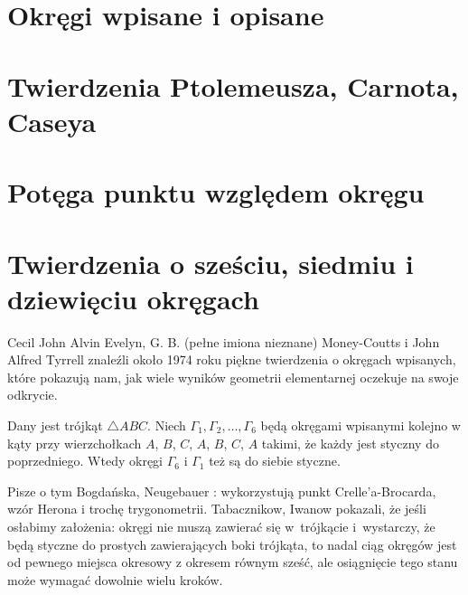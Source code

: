 \section{Okręgi wpisane i opisane}


\section{Twierdzenia Ptolemeusza, Carnota, Caseya}


%
\section{Potęga punktu względem okręgu}

%

\section{Twierdzenia o sześciu, siedmiu i dziewięciu okręgach}
\label{sssection_6_7_9_circles}
Cecil John Alvin Evelyn, G. B. (pełne imiona nieznane) Money-Coutts i John Alfred Tyrrell znaleźli około 1974 roku piękne twierdzenia o okręgach wpisanych, które pokazują nam, jak wiele wyników geometrii elementarnej oczekuje na swoje odkrycie.

\begin{proposition}
%
	Dany jest trójkąt $\triangle ABC$.
	Niech $\Gamma_1, \Gamma_2, \ldots, \Gamma_6$ będą okręgami wpisanymi kolejno w kąty przy wierzchołkach $A$, $B$, $C$, $A$, $B$, $C$, $A$ takimi, że każdy jest styczny do poprzedniego.
	Wtedy okręgi $\Gamma_6$ i $\Gamma_1$ też są do siebie styczne.
\end{proposition}

Pisze o tym Bogdańska, Neugebauer \cite[s. 101]{neugebauer_2018}: wykorzystują punkt Crelle'a-Brocarda, wzór Herona i trochę trygonometrii.
Tabacznikow, Iwanow \cite{ivanov_tabachnikov_2016} pokazali, że jeśli osłabimy założenia: okręgi nie muszą zawierać się w~trójkącie i~wystarczy, że będą styczne do prostych zawierających boki trójkąta, to nadal ciąg okręgów jest od pewnego miejsca okresowy z okresem równym sześć, ale osiągnięcie tego stanu może wymagać dowolnie wielu kroków.
%
%


